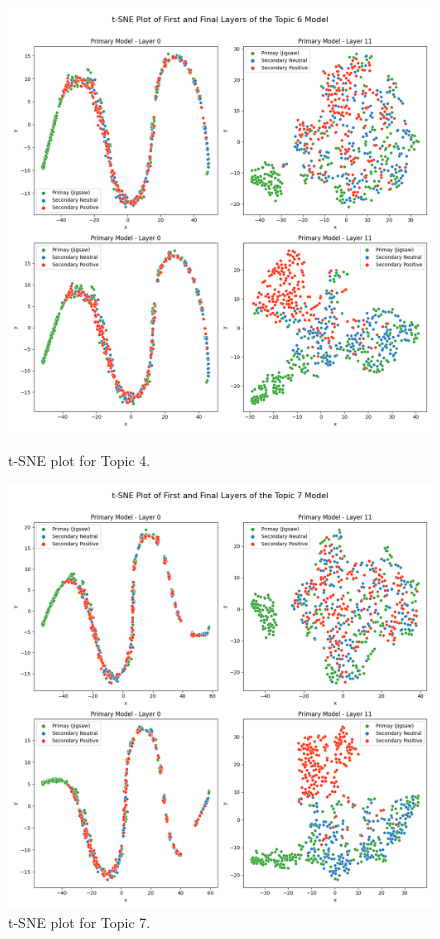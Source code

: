 \begin{figure}[ht]
    \centering
    
    \begin{minipage}{0.49\textwidth}
        \centering
        \includegraphics[width=\linewidth]{graphs/tsne/combined_6.png}
        \caption{t-SNE plot for Topic 4.}
        \label{sub:topic6}
    \end{minipage}
    \hfill
    \begin{minipage}{0.49\textwidth}
        \centering
        \includegraphics[width=\linewidth]{graphs/tsne/combined_7.png}
        \caption{t-SNE plot for Topic 7.}
        \label{sub:topic7}
    \end{minipage}
    

\end{figure}
